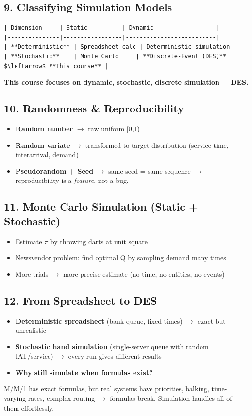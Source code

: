 \documentclass[11pt]{article}
\begin{document}
\subsection*{9. Classifying Simulation Models}
\begin{verbatim}
| Dimension     | Static          | Dynamic                  |
|---------------|-----------------|--------------------------|
| **Deterministic** | Spreadsheet calc | Deterministic simulation |
| **Stochastic**    | Monte Carlo     | **Discrete-Event (DES)** $\leftarrow$ **This course** |
\end{verbatim}

\textbf{This course focuses on dynamic, stochastic, discrete simulation = DES.}

\subsection*{10. Randomness \& Reproducibility}
\begin{itemize}[leftmargin=*]
\item \textbf{Random number} $\rightarrow$ raw uniform [0,1)  
\item \textbf{Random variate} $\rightarrow$ transformed to target distribution (service time, interarrival, demand)  
\item \textbf{Pseudorandom + Seed} $\rightarrow$ same seed = same sequence $\rightarrow$ reproducibility is a \textit{feature}, not a bug.
\end{itemize}

\subsection*{11. Monte Carlo Simulation (Static + Stochastic)}
\begin{itemize}[leftmargin=*]
\item Estimate $\pi$ by throwing darts at unit square  
\item Newsvendor problem: find optimal Q by sampling demand many times  
\item More trials $\rightarrow$ more precise estimate (no time, no entities, no events)
\end{itemize}

\subsection*{12. From Spreadsheet to DES}
\begin{itemize}[leftmargin=*]
\item \textbf{Deterministic spreadsheet} (bank queue, fixed times) $\rightarrow$ exact but unrealistic  
\item \textbf{Stochastic hand simulation} (single-server queue with random IAT/service) $\rightarrow$ every run gives different results  
\item \textbf{Why still simulate when formulas exist?}  
\end{itemize}
  M/M/1 has exact formulas, but real systems have priorities, balking, time-varying rates, complex routing $\rightarrow$ formulas break. Simulation handles all of them effortlessly.
\end{document}
